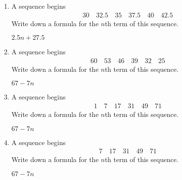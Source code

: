 \begin{enumerate} [leftmargin=0cm]
    \begin{envAnswer}[blankline=2,text=] $ 3n+11      $ \end{envAnswer}

\item A sequence begins \\
      \begin{align*}
            30  \quad 32.5   \quad  35  \quad  37.5  \quad  40  \quad  42.5
      \end{align*}       
    Write down a formula for the $n$th term of this sequence.       

    \begin{envAnswer}[blankline=2,text=] $ 2.5n+27.5      $ \end{envAnswer}
    
\item A sequence begins \\
      \begin{align*}
            60  \quad 53  \quad  46  \quad  39  \quad  32  \quad  25
      \end{align*}       
    Write down a formula for the $n$th term of this sequence.       

    \begin{envAnswer}[blankline=2,text=] $ 67-7n      $ \end{envAnswer}
    

\item A sequence begins \\
      \begin{align*}
            1  \quad 7  \quad  17  \quad  31  \quad  49  \quad  71 
      \end{align*}       
    Write down a formula for the $n$th term of this sequence.       

    \begin{envAnswer}[blankline=2,text=] $ 67-7n      $ \end{envAnswer}

\item A sequence begins \\
      \begin{align*}
            7  \quad  17  \quad  31  \quad  49  \quad  71 
      \end{align*}       
    Write down a formula for the $n$th term of this sequence.       

    \begin{envAnswer}[blankline=2,text=] $ 67-7n      $ \end{envAnswer}



\end{enumerate}
